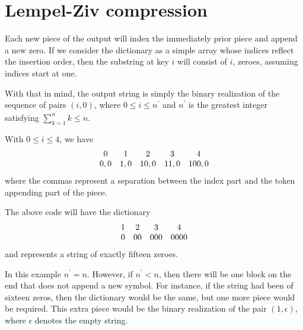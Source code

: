 \documentclass{article}
\begin{document}
\section{Lempel-Ziv compression}

Each new piece of the output will index the immediately prior piece and append
a new zero. If we consider the dictionary as a simple array whose indices
reflect the insertion order, then the substring at key $i$ will consist of $i$,
zeroes, assuming indices start at one.

With that in mind, the output string is simply the binary realization of the
sequence of pairs $(i, 0)$, where $0 \leq i \leq n^\prime$ and $n^\prime$ is
the greatest integer satisfying $\sum_{k=1}^{n^\prime} k \leq n$.

With $0 \leq i \leq 4$, we have
$$
\begin{array}{c c c c c}
    0 & 1 & 2 & 3 & 4 \\
    0, 0 & 1, 0 & 10, 0 & 11, 0 & 100, 0
\end{array}
$$
where the commas represent a separation between the index part and the token
appending part of the piece.

The above code will have the dictionary
$$
\begin{array}{c c c c}
    1 & 2 & 3 & 4 \\
    0 & 00 & 000 & 0000
\end{array}
$$
and represents a string of exactly fifteen zeroes.

In this example $n^\prime = n$. However, if $n^\prime < n$, then there will be
one block on the end that does not append a new symbol.
For instance, if the string had been of sixteen zeros, then the dictionary
would be the same, but one more piece would be required. This extra piece
would be the binary realization of the pair $(1,\epsilon)$, where $\epsilon$
denotes the empty string.
\end{document}
